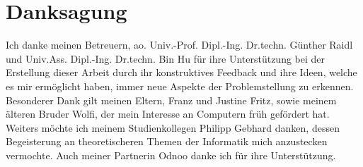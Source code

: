 \chapter*{Danksagung}

Ich danke meinen Betreuern, ao. Univ.-Prof. Dipl.-Ing. Dr.techn. Günther Raidl und Univ.Ass. Dipl.-Ing. Dr.techn. Bin Hu für ihre Unterstützung bei der Erstellung dieser Arbeit durch ihr konstruktives Feedback und ihre Ideen, welche es mir ermöglicht haben, immer neue Aspekte der Problemstellung zu erkennen.\\

Besonderer Dank gilt meinen Eltern, Franz und Justine Fritz, sowie meinem älteren Bruder Wolfi, der mein Interesse an Computern früh gefördert hat. Weiters möchte ich meinem Studienkollegen Philipp Gebhard danken, dessen Begeisterung an theoretischeren Themen der Informatik mich anzustecken vermochte. Auch meiner Partnerin Odnoo danke ich für ihre Unterstützung.